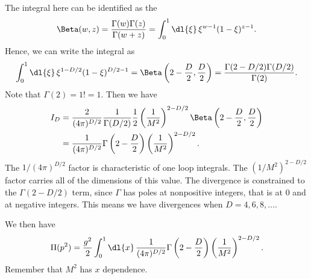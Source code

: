 \documentclass[fleqn]{NotesClass}
\begin{document}
    The integral here can be identified as the 
    \begin{equation}
        \Beta(w, z) = \frac{\Gamma(w)\Gamma(z)}{\Gamma(w + z)} = \int_0^{1} \dl{\xi} \, \xi^{w - 1} (1 - \xi)^{z - 1}.
    \end{equation}
    Hence, we can write the integral as
    \begin{equation}
        \int_0^1 \dl{\xi} \, \xi^{1 - D/2}(1 - \xi)^{D/2 - 1} = \Beta\left( 2 - \frac{D}{2}, \frac{D}{2} \right) = \frac{\Gamma(2 - D/2)\Gamma(D/2)}{\Gamma(2)}.
    \end{equation}
    Note that \(\Gamma(2) = 1! = 1\).
    Then we have
    \begin{align}
        I_D &= \frac{2}{(4\pi)^{D/2}} \frac{1}{\Gamma(D/2)} \frac{1}{2} \left( \frac{1}{M^2} \right)^{2-D/2} \Beta\left( 2 - \frac{D}{2}, \frac{D}{2} \right)\\
        &= \frac{1}{(4\pi)^{D/2}} \Gamma\left( 2 - \frac{D}{2} \right) \left( \frac{1}{M^2} \right)^{2 - D/2}.
    \end{align}
    The \(1/(4\pi)^{D/2}\) factor is characteristic of one loop integrals.
    The \((1/M^2)^{2 - D/2}\) factor carries all of the dimensions of this value.
    The divergence is constrained to the \(\Gamma(2 - D/2)\) term, since \(\Gamma\) has poles at nonpositive integers, that is at 0 and at negative integers.
    This means we have divergences when \(D = 4, 6, 8, \dotsc\).
    
    We then have
    \begin{equation}
        \Pi(p^2) = \frac{g^2}{2} \int_0^1 \dl{x} \, \frac{1}{(4\pi)^{D/2}} \Gamma\left( 2 - \frac{D}{2} \right) \left( \frac{1}{M^2} \right)^{2 - D/2}.
    \end{equation}
    Remember that \(M^2\) has \(x\) dependence.
    
\end{document}
